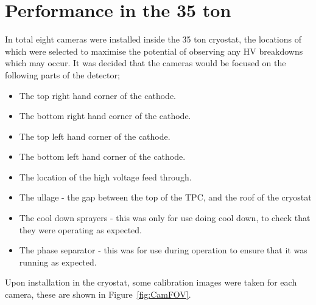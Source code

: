 \section{Performance in the 35 ton}  %
In total eight cameras were installed inside the 35 ton cryostat, the locations of which were selected to maximise the potential of observing any HV breakdowns which may occur. It was decided that the cameras would be focused on the following parts of the detector;
\begin{itemize}
\item The top right hand corner of the cathode.
\item The bottom right hand corner of the cathode.
\item The top left hand corner of the cathode.
\item The bottom left hand corner of the cathode.
\item The location of the high voltage feed through.
\item The ullage - the gap between the top of the TPC, and the roof of the cryostat
\item The cool down sprayers - this was only for use doing cool down, to check that they were operating as expected.
\item The phase separator - this was for use during operation to ensure that it was running as expected.
\end{itemize}
Upon installation in the cryostat, some calibration images were taken for each camera, these are shown in Figure~\ref{fig:CamFOV}. \\

